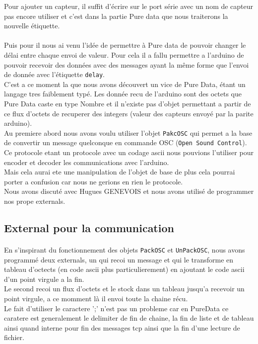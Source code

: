 \documentclass[a4paper, titlepage, oneside, 12pt]{article}%
\begin{document}
Pour ajouter un capteur, il suffit d'écrire sur le port série avec un nom de capteur pas encore utiliser et c'est dans la partie Pure data que nous traiterons la nouvelle étiquette.

\paragraph{}
Puis pour il nous ai venu l'idée de permettre à Pure data de pouvoir changer le délai entre chaque envoi de valeur. 
Pour cela il a fallu permettre a l'arduino de pouvoir recevoir des données avec des messages ayant la même forme que l'envoi de donnée avec l'étiquette \texttt{delay}.\\
C'est a ce moment la que nous avons découvert un vice de Pure Data, étant un langage tres faiblement typé. Les donnée recu de l'arduino sont des octets que Pure Data caste en type Nombre et il n'existe pas d'objet permettant a partir de ce flux d'octets de recuperer des integers (valeur des capteurs envoyé par la parite arduino).\\

Au premiere abord nous avons voulu utiliser l'objet \texttt{PakcOSC} qui permet a la base de convertir un message quelconque en commande OSC (\texttt{Open Sound Control}). Ce protocole etant un protocole avec un codage ascii nous pouvions l'utiliser pour encoder et decoder les communications avec l'arduino. \\
Mais cela aurai ete une manipulation de l'objet de base de plus cela pourrai porter a confusion car nous ne gerions en rien le protocole.\\
Nous avons discuté avec Hugues GENEVOIS et nous avons utilisé de programmer nos prope externals.

\subsection{External pour la communication}
\paragraph{}
En s'inspirant du fonctionnement des objets \texttt{PackOSC} et \texttt{UnPackOSC}, nous avons programmé deux externals, un qui recoi un message et qui le transforme en tableau d'octects (en code ascii plus particulierement) en ajoutant le code ascii d'un point virgule a la fin.\\
Le second recoi un flux d'octets et le stock dans un tableau jusqu'a recevoir un point virgule, a ce momment là il envoi toute la chaine récu.\\
Le fait d'utiliser le caractere ';' n'est pas un probleme car en PureData ce caratere est generalement le delimiter de fin de chaine, la fin de liste et de tableau ainsi quand interne pour fin des messages tcp ainsi que la fin d'une lecture de fichier.
\end{document}

